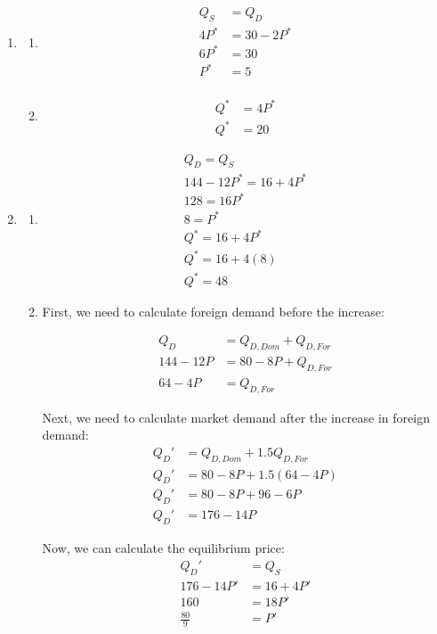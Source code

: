 \documentclass{article}
\begin{document}
\begin{enumerate}

\item

	\begin{enumerate}
	
	\item
	\begin{align*}
	Q_S &= Q_D \\
	4P^* &= 30 - 2P^* \\
	6P^* &= 30 \\
	P^* &= 5 \\
	\end{align*}
	
	\item
	\begin{align*}
	Q^* &= 4P^* \\
	Q^* &= 20
	\end{align*}
	
	\end{enumerate}
	
\item
	\begin{enumerate}
	
	\item
	\begin{gather*}
	Q_D = Q_S \\
	144 - 12P^* = 16 + 4P^* \\
	128 = 16P^* \\
	8 = P^* \\
	Q^* = 16 + 4P^* \\
	Q^* = 16 + 4(8) \\
	Q^* = 48
	\end{gather*}
	
	\item First, we need to calculate foreign demand before the increase:

	\begin{align*}
	Q_D &= Q_{D,Dom} + Q_{D,For} \\
	144 - 12 P &= 80 - 8P + Q_{D,For} \\
	64 - 4P &= Q_{D,For}
	\end{align*}
	
	Next, we need to calculate market demand after the increase in foreign demand:
	\begin{align*}
	Q_D' &= Q_{D,Dom} + 1.5Q_{D,For} \\
	Q_D' &= 80 - 8P + 1.5(64 - 4P) \\
	Q_D' &= 80 - 8P + 96 - 6P \\
	Q_D' &= 176 - 14P
	\end{align*}
	
	Now, we can calculate the equilibrium price:
	\begin{align*}
	Q_D' &= Q_S \\
	176 - 14P' &= 16 + 4P' \\
	160 &= 18P' \\
	\frac{80}{9} &= P'
	\end{align*}
	
	\end{enumerate}
	
\end{enumerate}
\end{document}
